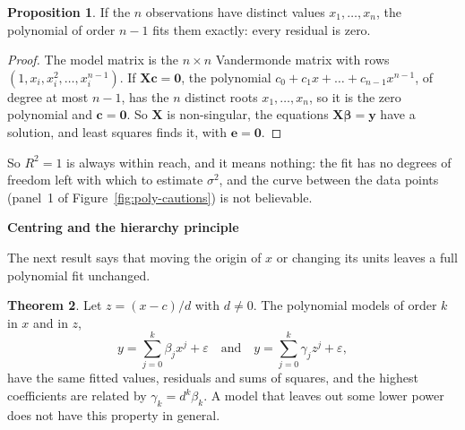 \documentclass[11pt,a4paper]{article}
\numberwithin{equation}{section}
\theoremstyle{definition}
\newtheorem{thm}{Theorem}[subsection]
\newtheorem{prop}[thm]{Proposition}
\newcommand{\subhead}[1]{%
  \par\medskip\noindent\textbf{#1}\par\nobreak\smallskip}
\begin{document}
\begin{prop}\label{prop:interpolate}
If the $n$ observations have distinct values $x_1, \dots, x_n$, the polynomial of order $n - 1$ fits them exactly:
every residual is zero.
\end{prop}

\begin{proof}
The model matrix is the $n \times n$ Vandermonde matrix with rows $(1, x_i, x_i^2, \dots, x_i^{n-1})$. If
$\mathbf{Xc} = \mathbf{0}$, the polynomial $c_0 + c_1x + \dots + c_{n-1}x^{n-1}$, of degree at most $n - 1$, has the $n$ distinct roots
$x_1, \dots, x_n$, so it is the zero polynomial and $\mathbf{c} = \mathbf{0}$. So $\mathbf{X}$ is non-singular, the equations
$\mathbf{X}\boldsymbol\beta = \mathbf{y}$ have a solution, and least squares finds it, with $\mathbf{e} = \mathbf{0}$.
\end{proof}

So $R^2 = 1$ is always within reach, and it means nothing: the fit has no degrees of freedom left with which
to estimate $\sigma^2$, and the curve between the data points (panel~1 of Figure~\ref{fig:poly-cautions}) is not
believable.

\subhead{Centring and the hierarchy principle}
The next result says that moving the origin of $x$ or changing its units leaves a full polynomial fit
unchanged.

\begin{thm}\label{thm:poly-invariance}
Let $z = (x - c)/d$ with $d \ne 0$. The polynomial models of order $k$ in $x$ and in $z$,
\[
y = \sum_{j=0}^k \beta_jx^j + \varepsilon \quad\text{and}\quad y = \sum_{j=0}^k \gamma_jz^j + \varepsilon ,
\]
have the same fitted values, residuals and sums of squares, and the highest coefficients are related by
$\gamma_k = d^k\beta_k$. A model that leaves out some lower power does not have this property in general.
\end{thm}
\end{document}
